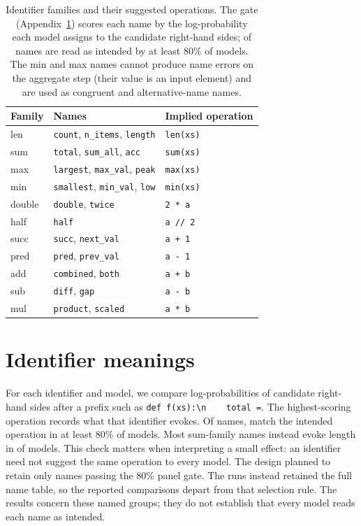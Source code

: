 \begin{table}[t]
\centering\small
\begin{tabular}{@{}lll@{}}
\toprule
Family & Names & Implied operation \\
\midrule
len & \texttt{count}, \texttt{n\_items}, \texttt{length} & \texttt{len(xs)} \\
sum & \texttt{total}, \texttt{sum\_all}, \texttt{acc} & \texttt{sum(xs)} \\
max & \texttt{largest}, \texttt{max\_val}, \texttt{peak} & \texttt{max(xs)} \\
min & \texttt{smallest}, \texttt{min\_val}, \texttt{low} & \texttt{min(xs)} \\
double & \texttt{double}, \texttt{twice} & \texttt{2 * a} \\
half & \texttt{half} & \texttt{a // 2} \\
succ & \texttt{succ}, \texttt{next\_val} & \texttt{a + 1} \\
pred & \texttt{pred}, \texttt{prev\_val} & \texttt{a - 1} \\
add & \texttt{combined}, \texttt{both} & \texttt{a + b} \\
sub & \texttt{diff}, \texttt{gap} & \texttt{a - b} \\
mul & \texttt{product}, \texttt{scaled} & \texttt{a * b} \\
\bottomrule
\end{tabular}
\caption{Identifier families and their suggested operations. The gate (Appendix~\ref{c-app:gate}) scores each name by the log-probability each
model assigns to the candidate right-hand sides;  of  names are
read as intended by at least 80\% of models. The min and max names cannot produce name errors on the
aggregate step (their value is an input element) and are used as congruent and
alternative-name names.}
\label{c-tab:gate}
\end{table}

\section{Identifier meanings}
\label{c-app:gate}
For each identifier and model, we compare log-probabilities of candidate right-hand sides after
a prefix such as \texttt{def f(xs):\textbackslash n\ \ \ \ total =}.
The highest-scoring operation records what that identifier evokes. Of  names,
 match the intended operation in at least 80\% of models. Most sum-family names
instead evoke length in  of  models. This check matters
when interpreting a small effect: an identifier need not suggest the same operation to every model.
The design planned to retain only names passing the 80\% panel gate. The runs instead retained
the full name table, so the reported comparisons depart from that selection rule. The results
concern these named groups; they do not establish that every model reads each name as intended.

